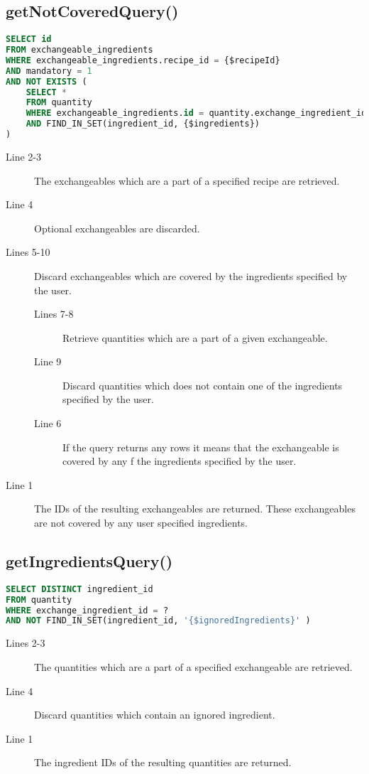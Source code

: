 \subsection*{getNotCoveredQuery()}
\begin{lstlisting}[language=SQL, morekeywords={FIND_IN_SET}, float=h, label={}, caption={Query to find the exchangeables that are not covered.}]
SELECT id
FROM exchangeable_ingredients
WHERE exchangeable_ingredients.recipe_id = {$recipeId}
AND mandatory = 1
AND NOT EXISTS (
    SELECT * 
    FROM quantity
    WHERE exchangeable_ingredients.id = quantity.exchange_ingredient_id
    AND FIND_IN_SET(ingredient_id, {$ingredients})
)
\end{lstlisting}
\begin{description}
\item[Line 2-3] The exchangeables which are a part of a specified recipe are retrieved.
\item[Line 4] Optional exchangeables are discarded.
\item[Lines 5-10] Discard exchangeables which are covered by the ingredients specified by the user.
	\begin{description}
	\item[Lines 7-8] Retrieve quantities which are a part of a given exchangeable.
	\item[Line 9] Discard quantities which does not contain one of the ingredients specified by the user.
	\item[Line 6] If the query returns any rows it means that the exchangeable is covered by any f the ingredients specified by the user.
	\end{description}
\item[Line 1] The IDs of the resulting exchangeables are returned. These exchangeables are not covered by any user specified ingredients.
\end{description}



\subsection*{getIngredientsQuery()}
\begin{lstlisting}[language=SQL, morekeywords={FIND_IN_SET}, float=h, label={}, caption={Query to get the ingredient of an exchangeable, excluding ignored ingredients.}]
SELECT DISTINCT ingredient_id
FROM quantity
WHERE exchange_ingredient_id = ?
AND NOT FIND_IN_SET(ingredient_id, '{$ignoredIngredients}' )
\end{lstlisting}
\begin{description}
\item[Lines 2-3] The quantities which are a part of a specified exchangeable are retrieved.
\item[Line 4] Discard quantities which contain an ignored ingredient.
\item[Line 1] The ingredient IDs of the resulting quantities are returned.
\end{description}